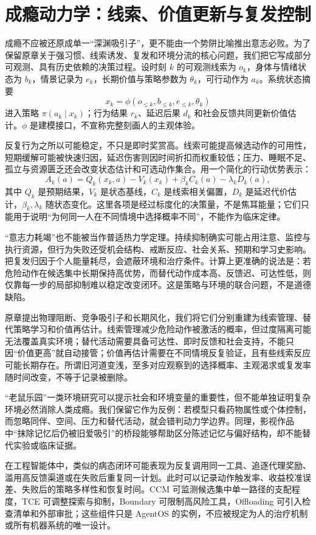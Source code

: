 \section{成瘾动力学：线索、价值更新与复发控制}
\label{sec:addiction_dynamics}
成瘾不应被还原成单一“深渊吸引子”，更不能由一个势阱比喻推出意志必败。为了保留原章关于强习惯、线索诱发、复发和环境分流的核心问题，我们把它写成部分可观测、具有历史依赖的决策过程。设时刻 $k$ 的可观测线索为 $o_k$，身体与情绪状态为 $b_k$，情景记录为 $e_k$，长期价值与策略参数为 $\theta_k$，可行动作为 $a_k$。系统状态摘要
\[
x_k=\phi(o_{\le k},b_{\le k},e_{\le k},\theta_k)
\]
进入策略 $\pi(a_k\mid x_k)$；行为结果 $r_k$、延迟后果 $d_k$ 和社会反馈共同更新价值估计。$\phi$ 是建模接口，不宣称完整刻画人的主观体验。

反复行为之所以可能稳定，不只是即时奖赏高。线索可能提高候选动作的可用性，短期缓解可能被快速归因，延迟伤害则因时间折扣而权重较低；压力、睡眠不足、孤立与资源匮乏还会改变状态估计和可选动作集合。用一个简化的行动优势表示：
\[
A_k(a)=Q_k(x_k,a)-V_k(x_k)
+\beta_k C_k(a)-\lambda_k D_k(a),
\]
其中 $Q_k$ 是预期结果，$V_k$ 是状态基线，$C_k$ 是线索相关偏置，$D_k$ 是延迟代价估计，$\beta_k,\lambda_k$ 随状态变化。这里各项是经过标度化的决策量，不是焦耳能量；它们只能用于说明“为何同一人在不同情境中选择概率不同”，不能作为临床定律。

“意志力耗竭”也不能被当作普适热力学定理。持续抑制确实可能占用注意、监控与执行资源，但行为失败还受机会结构、戒断反应、社会关系、预期和学习史影响。把复发归因于个人能量耗尽，会遮蔽环境和治疗条件。计算上更准确的说法是：若危险动作在候选集中长期保持高优势，而替代动作成本高、反馈迟、可达性低，则仅靠每一步的局部抑制难以稳定改变闭环。这是策略与环境的联合问题，不是道德缺陷。

原章提出物理阻断、竞争吸引子和长期风化，我们将它们分别重建为线索管理、替代策略学习和价值再估计。线索管理减少危险动作被激活的概率，但过度隔离可能无法覆盖真实环境；替代活动需要具备可达性、即时反馈和社会支持，不能只因“价值更高”就自动接管；价值再估计需要在不同情境反复验证，且有些线索反应可能长期存在。所谓旧河道变浅，至多对应观察到的选择概率、主观渴求或复发率随时间改变，不等于记录被删除。

“老鼠乐园”一类环境研究可以提示社会和环境变量的重要性，但不能单独证明复杂环境必然消除人类成瘾。我们保留它作为反例：若模型只看药物属性或个体控制，而忽略同伴、空间、压力和替代活动，就会错判动力学边界。同理，影视作品中“抹除记忆后仍被旧爱吸引”的桥段能够帮助区分陈述记忆与偏好结构，却不能替代实验或临床证据。

在工程智能体中，类似的病态闭环可能表现为反复调用同一工具、追逐代理奖励、滥用高反馈渠道或在失败后重复同一计划。此时可以记录动作触发率、收益校准误差、失败后的策略多样性和恢复时间。CCM 可监测候选集中单一路径的支配程度，TCE 可调整探索与抑制，Boundary 可限制高风险工具，Offloading 可引入检查清单和外部审批；这些组件只是 AgentOS 的实例，不应被规定为人的治疗机制或所有机器系统的唯一设计。

